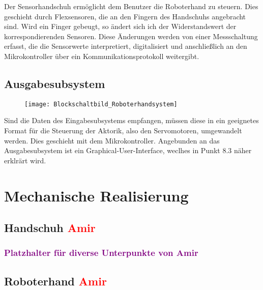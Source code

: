 \documentclass[titlepage,12pt,twoside]{article}
\begin{document}
Der Sensorhandschuh ermöglicht dem Benutzer die Roboterhand zu steuern. Dies geschieht durch Flexsensoren, die an den Fingern des 
Handschuhs angebracht sind. Wird ein Finger gebeugt, so ändert sich ich der Widerstandswert der korrespondierenden Sensoren. Diese Änderungen 
werden von einer Messschaltung erfasst, die die Sensorwerte interpretiert, digitalisiert und anschließlich an den Mikrokontroller über ein 
Kommunikationsprotokoll weitergibt. \\

\subsection{Ausgabesubsystem}

\begin{figure}[H]
	\begin{center}
		\scalebox{0.8}
		{\texttt{[image: Blockschaltbild\_Roboterhandsystem]}}
	\end{center}
\end{figure}

Sind die Daten des Eingabesubsystems empfangen, müssen diese in ein geeignetes Format für die Steuerung der Aktorik, also den Servomotoren,
umgewandelt werden. Dies geschieht mit dem Mikrokontroller. Angebunden an das Ausgabesubsystem ist ein Graphical-User-Interface, 
weclhes in Punkt 8.3 näher erklrärt wird. \\


\section{Mechanische Realisierung}

\subsection{Handschuh \textcolor{red}{Amir}}
\subsubsection{\textcolor{purple}{Platzhalter für diverse Unterpunkte von Amir}}

\subsection{Roboterhand \textcolor{red}{Amir}}
\end{document}
